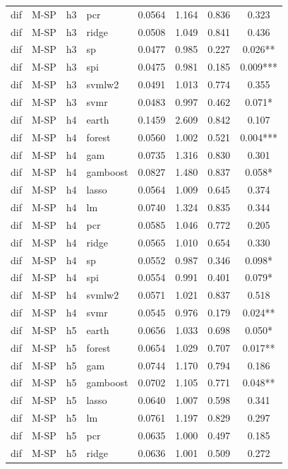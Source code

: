 \begin{ThreePartTable}
\begin{longtable}[t]{llclcccc}
dif & M-SP & h3 & pcr & 0.0564 & 1.164 & 0.836 & 0.323\\
dif & M-SP & h3 & ridge & 0.0508 & 1.049 & 0.841 & 0.436\\
dif & M-SP & h3 & sp & 0.0477 & 0.985 & 0.227 & 0.026**\\
dif & M-SP & h3 & spi & 0.0475 & 0.981 & 0.185 & 0.009***\\
dif & M-SP & h3 & svmlw2 & 0.0491 & 1.013 & 0.774 & 0.355\\
dif & M-SP & h3 & svmr & 0.0483 & 0.997 & 0.462 & 0.071*\\
\addlinespace
dif & M-SP & h4 & earth & 0.1459 & 2.609 & 0.842 & 0.107\\
dif & M-SP & h4 & forest & 0.0560 & 1.002 & 0.521 & 0.004***\\
dif & M-SP & h4 & gam & 0.0735 & 1.316 & 0.830 & 0.301\\
dif & M-SP & h4 & gamboost & 0.0827 & 1.480 & 0.837 & 0.058*\\
dif & M-SP & h4 & lasso & 0.0564 & 1.009 & 0.645 & 0.374\\
dif & M-SP & h4 & lm & 0.0740 & 1.324 & 0.835 & 0.344\\
dif & M-SP & h4 & pcr & 0.0585 & 1.046 & 0.772 & 0.205\\
dif & M-SP & h4 & ridge & 0.0565 & 1.010 & 0.654 & 0.330\\
dif & M-SP & h4 & sp & 0.0552 & 0.987 & 0.346 & 0.098*\\
dif & M-SP & h4 & spi & 0.0554 & 0.991 & 0.401 & 0.079*\\
dif & M-SP & h4 & svmlw2 & 0.0571 & 1.021 & 0.837 & 0.518\\
dif & M-SP & h4 & svmr & 0.0545 & 0.976 & 0.179 & 0.024**\\
\addlinespace
dif & M-SP & h5 & earth & 0.0656 & 1.033 & 0.698 & 0.050*\\
dif & M-SP & h5 & forest & 0.0654 & 1.029 & 0.707 & 0.017**\\
dif & M-SP & h5 & gam & 0.0744 & 1.170 & 0.794 & 0.186\\
dif & M-SP & h5 & gamboost & 0.0702 & 1.105 & 0.771 & 0.048**\\
dif & M-SP & h5 & lasso & 0.0640 & 1.007 & 0.598 & 0.341\\
dif & M-SP & h5 & lm & 0.0761 & 1.197 & 0.829 & 0.297\\
dif & M-SP & h5 & pcr & 0.0635 & 1.000 & 0.497 & 0.185\\
dif & M-SP & h5 & ridge & 0.0636 & 1.001 & 0.509 & 0.272\\

\end{longtable}
\end{ThreePartTable}
